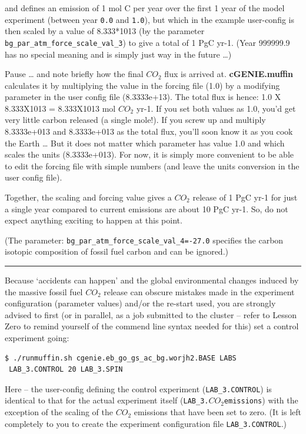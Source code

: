 \documentclass[11pt,fleqn]{book} %
\begin{document}
and defines an emission of 1 mol C per year over the first 1 year of the model experiment (between year \texttt{0.0} and \texttt{1.0}), but which in the example user-config is then scaled by a value of 8.333*1013 (by the parameter \texttt{bg\_par\_atm\_force\_scale\_val\_3}) to give a total of 1 PgC yr-1. (Year 999999.9 has no special meaning and is simply just way in the future …)

Pause … and note briefly how the final \(CO_{2}\) flux is arrived at. \textbf{cGENIE.muffin} calculates it by multiplying the value in the forcing file (1.0) by a modifying parameter in the user config file (8.3333e+13). The total flux is hence: 1.0 X 8.333X1013 = 8.333X1013 mol \(CO_{2}\) yr-1. If you set both values as 1.0, you’d get very little carbon released (a single mole!). If you screw up and multiply 8.3333e+013 and 8.3333e+013 as the total flux, you’ll soon know it as you cook the Earth … But it does not matter which parameter has value 1.0 and which scales the units (8.3333e+013). For now, it is simply more convenient to be able to edit the forcing file with simple numbers (and leave the units conversion in the user config file).

Together, the scaling and forcing value gives a \(CO_{2}\) release of 1 PgC yr-1 for just a single year compared to current emissions are about 10 PgC yr-1. So, do not expect anything exciting to happen at this point.

(The parameter: \texttt{bg\_par\_atm\_force\_scale\_val\_4=-27.0} specifies the carbon isotopic composition of fossil fuel carbon and can be ignored.)

\vspace{1mm}
\noindent\rule{4cm}{0.1mm}
\vspace{2mm}

Because ‘accidents can happen’ and the global environmental changes induced by the massive fossil fuel \(CO_{2}\) release can obscure mistakes made in the experiment configuration (parameter values) and/or the re-start used, you are strongly advised to first (or in parallel, as a job submitted to the cluster – refer to Lesson Zero to remind yourself of the commend line syntax needed for this) set a control experiment going:
\vspace{-2pt}\begin{verbatim}
$ ./runmuffin.sh cgenie.eb_go_gs_ac_bg.worjh2.BASE LABS
 LAB_3.CONTROL 20 LAB_3.SPIN
\end{verbatim}\vspace{-2pt}
Here – the user-config defining the control experiment (\texttt{LAB\_3.CONTROL}) is identical to that for the actual experiment itself (\texttt{LAB\_3.\(CO_{2}\)emissions}) with the exception of the scaling of the \(CO_{2}\) emissions that have been set to zero. (It is left completely to you to create the experiment configuration file \texttt{LAB\_3.CONTROL}.)
\end{document}
